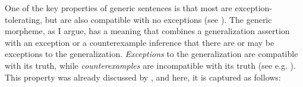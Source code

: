 \documentclass[output=paper,colorlinks,citecolor=brown]{langscibook}
\begin{document}
\label{sec:no-exceptions}

One of the key properties of generic sentences is that most are exception-tolera\-ting, but
are also compatible with no exceptions (see ).
The generic morpheme, as I argue, has a meaning
that combines a generalization assertion with an exception or a counterexample inference
that there are or may be exceptions to the generalization.
\textit{Exceptions} to the generalization are compatible with its truth, while \textit{counterexamples} are incompatible with its truth (see e.g. \citealt{nickel2010}). This property was already discussed by \citet{filip1993berkeleyva,filip1994mitva,filip2019harvardva, filip2021cologneva}, and here, it is captured as follows:
\end{document}
